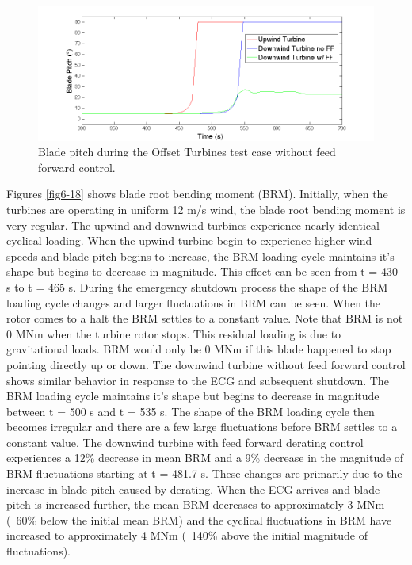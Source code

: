 \begin{figure}[ht] 
	\centering
		\includegraphics[width = \linewidth]{Figures/ch6Figures/fig6-17.png}

	\caption{Blade pitch during the Offset Turbines test case without feed forward control.}
	\label{fig6-17}
\end{figure}

Figures \ref{fig6-18} shows blade root bending moment (BRM). Initially, when the turbines are operating in uniform 12 m/s wind, the blade root bending moment is very regular. The upwind and downwind turbines experience nearly identical cyclical loading. When the upwind turbine begin to experience higher wind speeds and blade pitch begins to increase, the BRM loading cycle maintains it's shape but begins to decrease in magnitude. This effect can be seen from t = 430 s to t = 465 s. During the emergency shutdown process the shape of the BRM loading cycle changes and larger fluctuations in BRM can be seen. When the rotor comes to a halt the BRM settles to a constant value. Note that BRM is not 0 MNm when the turbine rotor stops. This residual loading is due to gravitational loads. BRM would only be 0 MNm if this blade happened to stop pointing directly up or down. The downwind turbine without feed forward control shows similar behavior in response to the ECG and subsequent shutdown. The BRM loading cycle maintains it's shape but begins to decrease in magnitude between t = 500 s and t = 535 s. The shape of the BRM loading cycle then becomes irregular and there are a few large fluctuations before BRM settles to a constant value. The downwind turbine with feed forward derating control experiences a 12\% decrease in mean BRM and a 9\% decrease in the magnitude of BRM fluctuations starting at t = 481.7 s. These changes are primarily due to the increase in blade pitch caused by derating. When the ECG arrives and blade pitch is increased further, the mean BRM decreases to approximately 3 MNm (~60\% below the initial mean BRM) and the cyclical fluctuations in BRM have increased to approximately 4 MNm (~140\% above the initial magnitude of fluctuations).


